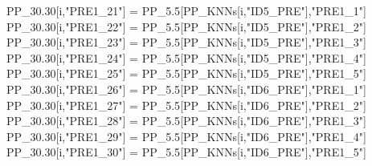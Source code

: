 \documentclass[12pt,twoside]{reedthesis}
\newenvironment{Shaded}{\begin{snugshade}}{\end{snugshade}}
\newcommand{\FloatTok}[1]{\textcolor[rgb]{0.00,0.00,0.81}{#1}}
\newcommand{\NormalTok}[1]{#1}
\newcommand{\StringTok}[1]{\textcolor[rgb]{0.31,0.60,0.02}{#1}}
\begin{document}
\begin{Shaded}
\begin{Highlighting}[]
{\NormalTok{  PP_}\FloatTok{30.30}\NormalTok{[i,}\StringTok{"PRE1_21"}\NormalTok{] =}\StringTok{ }\NormalTok{PP_}\FloatTok{5.5}\NormalTok{[PP_KNNs[i,}\StringTok{"ID5_PRE"}\NormalTok{],}\StringTok{"PRE1_1"}\NormalTok{]}
\NormalTok{  PP_}\FloatTok{30.30}\NormalTok{[i,}\StringTok{"PRE1_22"}\NormalTok{] =}\StringTok{ }\NormalTok{PP_}\FloatTok{5.5}\NormalTok{[PP_KNNs[i,}\StringTok{"ID5_PRE"}\NormalTok{],}\StringTok{"PRE1_2"}\NormalTok{]}
\NormalTok{  PP_}\FloatTok{30.30}\NormalTok{[i,}\StringTok{"PRE1_23"}\NormalTok{] =}\StringTok{ }\NormalTok{PP_}\FloatTok{5.5}\NormalTok{[PP_KNNs[i,}\StringTok{"ID5_PRE"}\NormalTok{],}\StringTok{"PRE1_3"}\NormalTok{]}
\NormalTok{  PP_}\FloatTok{30.30}\NormalTok{[i,}\StringTok{"PRE1_24"}\NormalTok{] =}\StringTok{ }\NormalTok{PP_}\FloatTok{5.5}\NormalTok{[PP_KNNs[i,}\StringTok{"ID5_PRE"}\NormalTok{],}\StringTok{"PRE1_4"}\NormalTok{]}
\NormalTok{  PP_}\FloatTok{30.30}\NormalTok{[i,}\StringTok{"PRE1_25"}\NormalTok{] =}\StringTok{ }\NormalTok{PP_}\FloatTok{5.5}\NormalTok{[PP_KNNs[i,}\StringTok{"ID5_PRE"}\NormalTok{],}\StringTok{"PRE1_5"}\NormalTok{]}
\NormalTok{  PP_}\FloatTok{30.30}\NormalTok{[i,}\StringTok{"PRE1_26"}\NormalTok{] =}\StringTok{ }\NormalTok{PP_}\FloatTok{5.5}\NormalTok{[PP_KNNs[i,}\StringTok{"ID6_PRE"}\NormalTok{],}\StringTok{"PRE1_1"}\NormalTok{]}
\NormalTok{  PP_}\FloatTok{30.30}\NormalTok{[i,}\StringTok{"PRE1_27"}\NormalTok{] =}\StringTok{ }\NormalTok{PP_}\FloatTok{5.5}\NormalTok{[PP_KNNs[i,}\StringTok{"ID6_PRE"}\NormalTok{],}\StringTok{"PRE1_2"}\NormalTok{]}
\NormalTok{  PP_}\FloatTok{30.30}\NormalTok{[i,}\StringTok{"PRE1_28"}\NormalTok{] =}\StringTok{ }\NormalTok{PP_}\FloatTok{5.5}\NormalTok{[PP_KNNs[i,}\StringTok{"ID6_PRE"}\NormalTok{],}\StringTok{"PRE1_3"}\NormalTok{]}
\NormalTok{  PP_}\FloatTok{30.30}\NormalTok{[i,}\StringTok{"PRE1_29"}\NormalTok{] =}\StringTok{ }\NormalTok{PP_}\FloatTok{5.5}\NormalTok{[PP_KNNs[i,}\StringTok{"ID6_PRE"}\NormalTok{],}\StringTok{"PRE1_4"}\NormalTok{]}
\NormalTok{  PP_}\FloatTok{30.30}\NormalTok{[i,}\StringTok{"PRE1_30"}\NormalTok{] =}\StringTok{ }\NormalTok{PP_}\FloatTok{5.5}\NormalTok{[PP_KNNs[i,}\StringTok{"ID6_PRE"}\NormalTok{],}\StringTok{"PRE1_5"}\NormalTok{]}


}
\end{Highlighting}
\end{Shaded}
\end{document}
